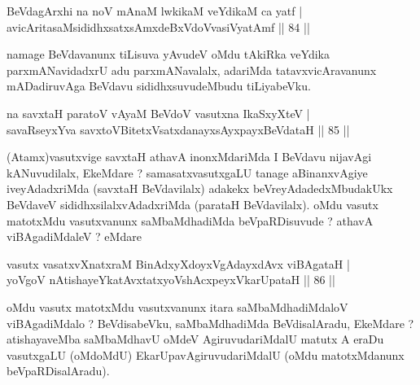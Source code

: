 
\begin{shl}
BeVdagArxhi na noV mAnaM lwkikaM veYdikaM ca yatf  | \\
avicAritasaMsididhxsatxsAmxdeBxVdoV\s vasiVyatAmf \hfill||  84 ||  
\end{shl}

\begin{artha}
namage BeVdavanunx tiLisuva yAvudeV oMdu tAkiRka veYdika parxmANavidadxrU adu parxmANavalalx, adariMda tatavxvicAravanunx mADadiruvAga BeVdavu sididhxsuvudeMbudu tiLiyabeVku.
\end{artha}

\begin{shl}
na savxtaH paratoV vA\s yaM BeVdoV vasutxna IkaSxyXteV  | \\
savaRseyxYva savxtoV\s BitetxVsatxdanayxsAyxpayxBeVdataH \hfill||  85 ||  
\end{shl}

\begin{artha}
(Atamx)vasutxvige savxtaH athavA inonxMdariMda I BeVdavu nijavAgi kANuvudilalx, EkeMdare ? samasatxvasutxgaLU tanage aBinanxvAgiye iveyAdadxriMda (savxtaH BeVdavilalx) adakekx beVreyAdadedxMbudakUkx BeVdaveV sididhxsilalxvAdadxriMda (parataH BeVdavilalx). oMdu vasutx matotxMdu vasutxvanunx saMbaMdhadiMda beVpaRDisuvude ? athavA viBAgadiMdaleV ? eMdare 
\end{artha}

\begin{shl}
vasutx vasatxvXnatxraM BinAdxyXdoyxVgAdayxdAvx viBAgataH  | \\
yoVgoV \footnotemark{}nAtishayeYkatAvxtatxyoVshAcxpeyxVkarUpataH \hfill||  86 ||  
\end{shl}

\begin{artha}
oMdu vasutx matotxMdu vasutxvanunx itara saMbaMdhadiMdaloV viBAgadiMdalo ? BeVdisabeVku, saMbaMdhadiMda BeVdisalAradu, EkeMdare ? atishayaveMba saMbaMdhavU oMdeV AgiruvudariMdalU matutx A eraDu vasutxgaLU (oMdoMdU) EkarUpavAgiruvudariMdalU (oMdu matotxMdanunx beVpaRDisalAradu).
\end{artha}


